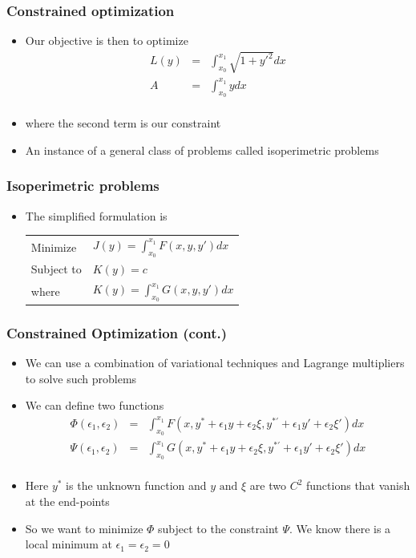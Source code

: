 \documentclass[10pt]{beamer}
\begin{document}
\begin{frame}
  \frametitle{Constrained optimization}
  \begin{itemize}
  \item Our objective is then to optimize
    \[
      \begin{array}{rcl}
        L(y) &=& \int_{x_0}^{x_1} \sqrt{ 1 + y'^2} dx\\[3mm]
        A    &=& \int_{x_0}^{x_1} y dx\\
      \end{array}
    \]
  \item where the second term is our constraint
  \item An instance of a general class of problems called isoperimetric problems
  \end{itemize}
\end{frame}

\begin{frame}
  \frametitle{Isoperimetric problems}
  \begin{itemize}
  \item The simplified formulation is\\
    
    \begin{tabular}{ll}
      Minimize & $J(y) = \int_{x_0}^{x_1} F(x,y,y') dx$\\
      Subject to & $K(y) = c$ \\
      where & $K(y) = \int_{x_0}^{x_1} G(x, y,y') dx$
    \end{tabular}
  \end{itemize}
\end{frame}

\begin{frame}
  \frametitle{Constrained Optimization (cont.)}
  \begin{itemize}
  \item We can use a combination of variational techniques and Lagrange multipliers to solve such problems
  \item We can define two functions
    \[
      \begin{array}{rcl}
        \Phi(\epsilon_1,\epsilon_2) & = & \int_{x_0}^{x_1} F(x, y^{*} + \epsilon_1 y + \epsilon_2 \xi, y^{*'} + \epsilon_1 y' + \epsilon_2 \xi {'}) dx\\
        \Psi(\epsilon_1,\epsilon_2) & = & \int_{x_0}^{x_1} G(x, y^{*} + \epsilon_1 y + \epsilon_2 \xi, y^{*'} + \epsilon_1 y' + \epsilon_2 \xi {'}) dx\\
      \end{array}
    \]
  \item Here $y^*$ is the unknown function and $y \mbox{ and } \xi$
    are two $C^2$ functions that vanish at the end-points
  \item So we want to minimize $\Phi$ subject to the constraint
    $\Psi$. We know there is a local minimum at
    $\epsilon_1 = \epsilon_2 = 0$
  \end{itemize}
\end{frame}
\end{document}
